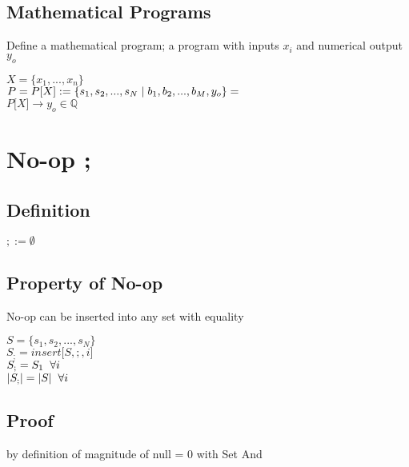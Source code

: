 \documentclass[11pt]{article}
\begin{document}
\subsection{Mathematical Programs}
Define a mathematical program; a program with inputs $x_i$ and numerical output $y_o$
\begin{center}
$
X = \{x_1,...,x_n\}
$
\\ \vspace{2mm}
$P = P\lbrack X \rbrack := \{ s_1,s_2,...,s_{N}\hspace{1mm}|\hspace{1mm} b_1, b_2,...,b_M,y_o\}=$
\\ \vspace{2mm}
$
P\lbrack X \rbrack \rightarrow y_o \in \mathbb{Q}
$
\end{center}




\newpage
\section{No-op ;}

\subsection{Definition}
\begin{center}
$
; := \emptyset
$
\end{center}

\subsection{Property of No-op}
No-op can be inserted into any set with equality
\begin{center}
$
S= \{s_1,s_2,...,s_N\}
$
\\ \vspace{2mm}
$
S_; = insert \lbrack S,;, i \rbrack
$
\\ \vspace{2mm}
$
S_; = S_1 \hspace{2mm} \forall i
$
\\ \vspace{2mm}
$
|S_;| = |S| \hspace{2mm} \forall i
$
\end{center}


\subsection{Proof}
by definition of magnitude of null = 0 with Set And
\end{document}
